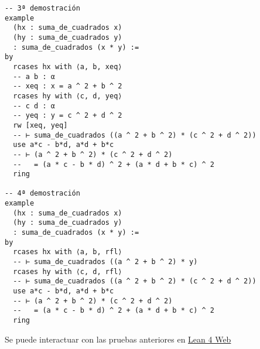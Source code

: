 \begin{verbatim}
-- 3ª demostración
example
  (hx : suma_de_cuadrados x)
  (hy : suma_de_cuadrados y)
  : suma_de_cuadrados (x * y) :=
by
  rcases hx with ⟨a, b, xeq⟩
  -- a b : α
  -- xeq : x = a ^ 2 + b ^ 2
  rcases hy with ⟨c, d, yeq⟩
  -- c d : α
  -- yeq : y = c ^ 2 + d ^ 2
  rw [xeq, yeq]
  -- ⊢ suma_de_cuadrados ((a ^ 2 + b ^ 2) * (c ^ 2 + d ^ 2))
  use a*c - b*d, a*d + b*c
  -- ⊢ (a ^ 2 + b ^ 2) * (c ^ 2 + d ^ 2)
  --   = (a * c - b * d) ^ 2 + (a * d + b * c) ^ 2
  ring

-- 4ª demostración
example
  (hx : suma_de_cuadrados x)
  (hy : suma_de_cuadrados y)
  : suma_de_cuadrados (x * y) :=
by
  rcases hx with ⟨a, b, rfl⟩
  -- ⊢ suma_de_cuadrados ((a ^ 2 + b ^ 2) * y)
  rcases hy with ⟨c, d, rfl⟩
  -- ⊢ suma_de_cuadrados ((a ^ 2 + b ^ 2) * (c ^ 2 + d ^ 2))
  use a*c - b*d, a*d + b*c
  -- ⊢ (a ^ 2 + b ^ 2) * (c ^ 2 + d ^ 2)
  --   = (a * c - b * d) ^ 2 + (a * d + b * c) ^ 2
  ring
\end{verbatim}
Se puede interactuar con las pruebas anteriores en \href{https://lean.math.hhu.de/\#url=https://raw.githubusercontent.com/jaalonso/Calculemus2/main/src/Producto\_de\_suma\_de\_cuadrados.lean}{Lean 4 Web}

